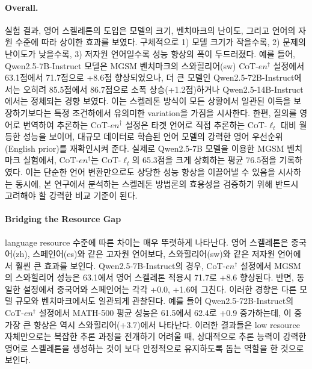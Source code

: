 \paragraph{Overall.}
실험 결과, 영어 스켈레톤의 도입은 모델의 크기, 벤치마크의 난이도, 그리고 언어의 자원 수준에 따라 상이한 효과를 보였다. 구체적으로 1) 모델 크기가 작을수록, 2) 문제의 난이도가 낮을수록, 3) 저자원 언어일수록 성능 향상의 폭이 두드러졌다. 예를 들어, Qwen2.5-7B-Instruct 모델은 MGSM 벤치마크의 스와힐리어(sw) \textsc{CoT-$en^{\dagger}$} 설정에서 63.1점에서 71.7점으로 +8.6점 향상되었으나, 더 큰 모델인 Qwen2.5-72B-Instruct에서는 오히려 85.5점에서 86.7점으로 소폭 상승(+1.2점)하거나 Qwen2.5-14B-Instruct에서는 정체되는 경향 보였다. 이는 스켈레톤 방식이 모든 상황에서 일관된 이득을 보장하기보다는 특정 조건하에서 유의미한 variation을 가짐을 시사한다.
한편, 질의를 영어로 번역하여 추론하는 \textsc{CoT-$en^{\dagger}$} 설정은 타겟 언어로 직접 추론하는 \textsc{CoT-$\ell_t$} 대비 월등한 성능을 보이며, 대규모 데이터로 학습된 언어 모델의 강력한 영어 우선순위(English prior)를 재확인시켜 준다. 실제로 Qwen2.5-7B 모델을 이용한 MGSM 벤치마크 실험에서, \textsc{CoT-$en^{\dagger}$}는 \textsc{CoT-$\ell_t$}의 65.3점을 크게 상회하는 평균 76.5점을 기록하였다. 이는 단순한 언어 변환만으로도 상당한 성능 향상을 이끌어낼 수 있음을 시사하는 동시에, 본 연구에서 분석하는 스켈레톤 방법론의 효용성을 검증하기 위해 반드시 고려해야 할 강력한 비교 기준이 된다.

\paragraph{Bridging the Resource Gap}
language resource 수준에 따른 차이는 매우 뚜렷하게 나타난다. 영어 스켈레톤은 중국어(zh), 스페인어(es)와 같은 고자원 언어보다, 스와힐리어(sw)와 같은 저자원 언어에서 훨씬 큰 효과를 보인다. Qwen2.5-7B-Instruct의 경우, CoT-$en^{\dagger}$ 설정에서 MGSM의 스와힐리어 성능은 63.1에서 영어 스켈레톤 적용시 71.7로 +8.6 향상된다. 반면, 동일한 설정에서 중국어와 스페인어는 각각 +0.0, +1.6에 그친다. 이러한 경향은 다른 모델 규모와 벤치마크에서도 일관되게 관찰된다. 예를 들어 Qwen2.5-72B-Instruct의 CoT-$en^{\dagger}$ 설정에서 MATH-500 평균 성능은 61.5에서 62.4로 +0.9 증가하는데, 이 중 가장 큰 향상은 역시 스와힐리어(+3.7)에서 나타난다. 이러한 결과들은 low resource 자체만으로는 복잡한 추론 과정을 전개하기 어려울 때, 상대적으로 추론 능력이 강력한 영어로 스켈레톤을 생성하는 것이 보다 안정적으로 유지하도록 돕는 역할을 한 것으로 보인다.

